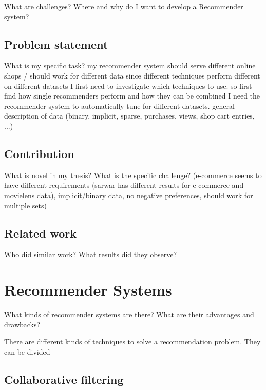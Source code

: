 \documentclass[10pt]{reportMaster}
\begin{document}
What are challenges?
Where and why do I want to develop a Recommender system?

\section{Problem statement}
What is my specific task?
my recommender system should serve different online shops / should work for different data
since different techniques perform different on different datasets I first need to investigate which techniques to use.
so first find how single recommenders perform and how they can be combined
I need the recommender system to automatically tune for different datasets.
general description of data (binary, implicit, sparse, purchases, views, shop cart entries, ...)

\section{Contribution}
What is novel in my thesis?
What is the specific challenge? (e-commerce seems to have different requirements (sarwar has different results for e-commerce and movielens data), implicit/binary data, no negative preferences, should work for multiple sets)

\section{Related work}
Who did similar work?
What results did they observe?










\chapter{Recommender Systems}
What kinds of recommender systems are there?
What are their advantages and drawbacks?

There are different kinds of techniques to solve a recommendation problem.
They can be divided 

\section{Collaborative filtering}
\end{document}

